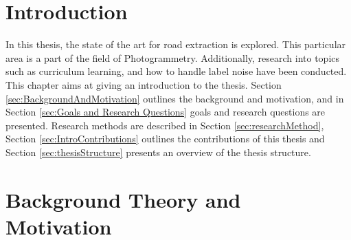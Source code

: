 \documentclass[a4paper]{book}
\begin{document}
\tableofcontents

\listoffigures

\listoftables


\mainmatter



\chapter{Introduction}
\label{cha:Introduction}
In this thesis, the state of the art for road extraction is explored. This particular area is a part of the field of Photogrammetry. Additionally, research into topics such as curriculum learning, and how to handle label noise have been conducted.\\

This chapter aims at giving an introduction to the thesis. Section \ref{sec:BackgroundAndMotivation} outlines the background and motivation, and in Section \ref{sec:Goals and Research Questions} goals and research questions are presented. Research methods are described in Section \ref{sec:researchMethod}, Section \ref{sec:IntroContributions} outlines the contributions of this thesis and Section \ref{sec:thesisStructure} presents an overview of the thesis structure.













\chapter{Background Theory and Motivation}\label{T-B}
\label{cha:TheoryAndBackground}








\end{document}
